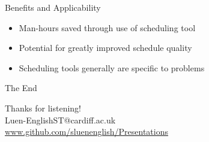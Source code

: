 \documentclass{beamer}
\begin{document}
\begin{frame}{Benefits and Applicability}
    \begin{itemize}
        \item Man-hours saved through use of scheduling tool
        \item Potential for greatly improved schedule quality
            \vspace{1cm}
        \item Scheduling tools generally are specific to problems 

    \end{itemize}
\end{frame}

\begin{frame}{The End}
    \begin{center}
        Thanks for listening! \\
        \vspace{12pt}
        Luen-EnglishST@cardiff.ac.uk\\
        \url{www.github.com/sluenenglish/Presentations}
    \end{center}
\end{frame}
\end{document}
